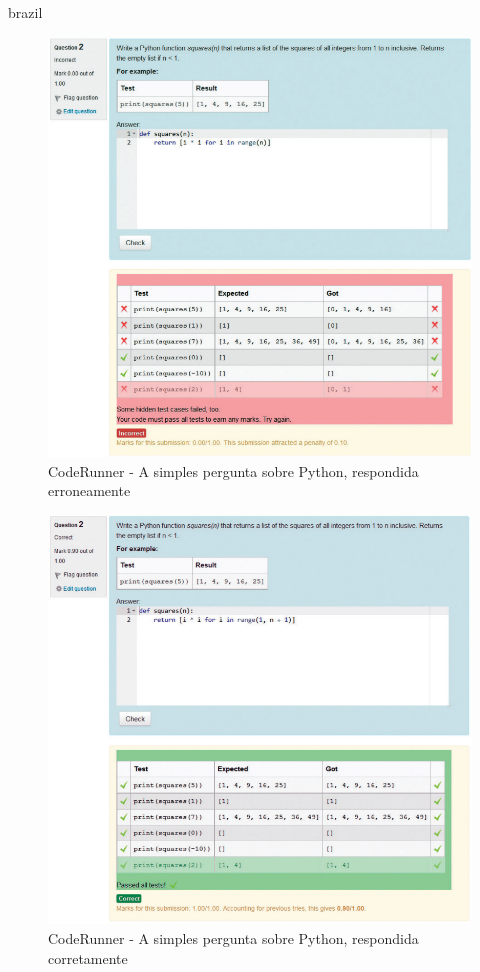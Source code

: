 \begin{otherlanguage*}{brazil}
\begin{figure}[h!]
	   \centering
            \caption{CodeRunner - A simples pergunta sobre Python, respondida erroneamente}
            \label{fig:ModeloConceitual}
	   	\includegraphics[scale=0.3]{pictures/CodeRunner_errada.png}
\end{figure}

\begin{figure}[h!]
	   \centering
            \caption{CodeRunner - A simples pergunta sobre Python, respondida corretamente}
            \label{fig:ModeloConceitual}
	   	\includegraphics[scale=0.3]{pictures/CodeRunner_correta.png}
\end{figure}


\end{otherlanguage*}
